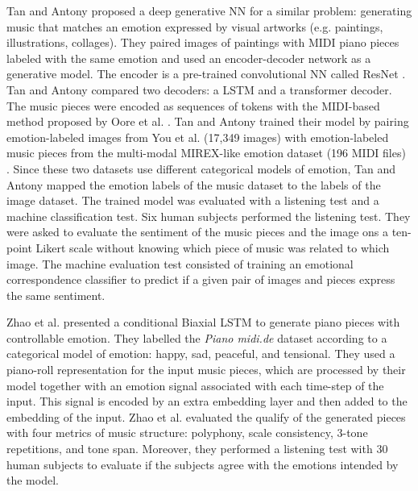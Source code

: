 Tan and Antony \cite{tan2020automated} proposed a deep generative NN for a similar problem: generating music that matches an emotion expressed by visual artworks (e.g. paintings, illustrations, collages). They paired images of paintings with MIDI piano pieces labeled with the same emotion and used an encoder-decoder network as a generative model. The encoder is a pre-trained convolutional NN called ResNet \cite{he2016deep}. Tan and Antony \cite{tan2020automated} compared two decoders: a LSTM and a transformer decoder.
The music pieces were encoded as sequences of tokens with the MIDI-based method proposed by Oore et al. \cite{oore2017learning}. Tan and Antony \cite{tan2020automated} trained their model by pairing emotion-labeled images from You et al. \cite{you2016building} (17,349 images) with emotion-labeled music pieces from the multi-modal MIREX-like emotion dataset (196 MIDI files) \cite{panda2013multi}. Since these two datasets use different categorical models of emotion, Tan and Antony \cite{tan2020automated} mapped the emotion labels of the music dataset to the labels of the image dataset. The trained model was evaluated with a listening test and a machine classification test. Six human subjects performed the listening test. They were asked to evaluate the sentiment of the music pieces and the image ons a ten-point Likert scale without knowing which piece of music was related to which image. The machine evaluation test consisted of training an emotional correspondence classifier to predict if a given pair of images and pieces express the same sentiment.

Zhao et al. \cite{zhao2019emotional} presented a conditional Biaxial LSTM \cite{johnson2017generating} to generate piano pieces with controllable emotion. They labelled the \textit{Piano midi.de} dataset according to a categorical model of emotion: happy, sad, peaceful, and tensional. They used a piano-roll representation for the input music pieces, which are processed by their model together with an emotion signal associated with each time-step of the input. This signal is encoded by an extra embedding layer and then added to the embedding of the input. Zhao et al. \cite{zhao2019emotional} evaluated the qualify of the generated pieces with four metrics of music structure: polyphony, scale consistency, 3-tone repetitions, and tone span. Moreover, they performed a listening test with 30 human subjects to evaluate if the subjects agree with the emotions intended by the model.

